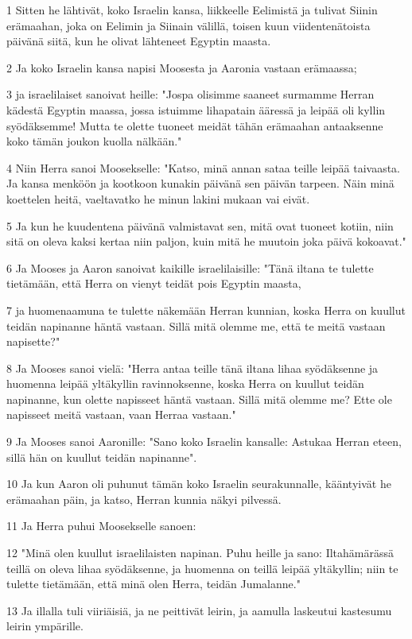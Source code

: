\par 1 Sitten he lähtivät, koko Israelin kansa, liikkeelle Eelimistä ja tulivat Siinin erämaahan, joka on Eelimin ja Siinain välillä, toisen kuun viidentenätoista päivänä siitä, kun he olivat lähteneet Egyptin maasta.
\par 2 Ja koko Israelin kansa napisi Moosesta ja Aaronia vastaan erämaassa;
\par 3 ja israelilaiset sanoivat heille: "Jospa olisimme saaneet surmamme Herran kädestä Egyptin maassa, jossa istuimme lihapatain ääressä ja leipää oli kyllin syödäksemme! Mutta te olette tuoneet meidät tähän erämaahan antaaksenne koko tämän joukon kuolla nälkään."
\par 4 Niin Herra sanoi Moosekselle: "Katso, minä annan sataa teille leipää taivaasta. Ja kansa menköön ja kootkoon kunakin päivänä sen päivän tarpeen. Näin minä koettelen heitä, vaeltavatko he minun lakini mukaan vai eivät.
\par 5 Ja kun he kuudentena päivänä valmistavat sen, mitä ovat tuoneet kotiin, niin sitä on oleva kaksi kertaa niin paljon, kuin mitä he muutoin joka päivä kokoavat."
\par 6 Ja Mooses ja Aaron sanoivat kaikille israelilaisille: "Tänä iltana te tulette tietämään, että Herra on vienyt teidät pois Egyptin maasta,
\par 7 ja huomenaamuna te tulette näkemään Herran kunnian, koska Herra on kuullut teidän napinanne häntä vastaan. Sillä mitä olemme me, että te meitä vastaan napisette?"
\par 8 Ja Mooses sanoi vielä: "Herra antaa teille tänä iltana lihaa syödäksenne ja huomenna leipää yltäkyllin ravinnoksenne, koska Herra on kuullut teidän napinanne, kun olette napisseet häntä vastaan. Sillä mitä olemme me? Ette ole napisseet meitä vastaan, vaan Herraa vastaan."
\par 9 Ja Mooses sanoi Aaronille: "Sano koko Israelin kansalle: Astukaa Herran eteen, sillä hän on kuullut teidän napinanne".
\par 10 Ja kun Aaron oli puhunut tämän koko Israelin seurakunnalle, kääntyivät he erämaahan päin, ja katso, Herran kunnia näkyi pilvessä.
\par 11 Ja Herra puhui Moosekselle sanoen:
\par 12 "Minä olen kuullut israelilaisten napinan. Puhu heille ja sano: Iltahämärässä teillä on oleva lihaa syödäksenne, ja huomenna on teillä leipää yltäkyllin; niin te tulette tietämään, että minä olen Herra, teidän Jumalanne."
\par 13 Ja illalla tuli viiriäisiä, ja ne peittivät leirin, ja aamulla laskeutui kastesumu leirin ympärille.

